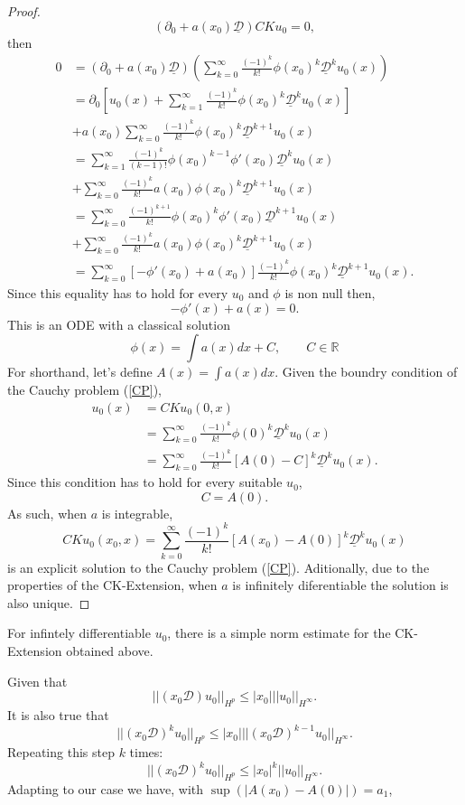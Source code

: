 \documentclass[12pt]{amsart}
\newcommand{\D}{\mathcal{D}}
\newcommand{\norm}[1]{|#1|}
\newcommand{\dnorm}[2]{||#1||_{#2}}
\theoremstyle{definition}
\begin{document}
\begin{proof}
\[
(\partial_0 + a(x_0)\underline{\D})CKu_0 =0,
\]
then
\begin{align*}
    0 
    &= (\partial_0 + a(x_0)\underline{\D})(\sum_{k = 0}^\infty \frac{(-1)^k}{k!}\phi(x_0)^k\underline{\D}^ku_0(x)) \\
    & = \partial_0[u_0(x) + \sum_{k = 1}^\infty \frac{(-1)^k}{k!}\phi(x_0)^k\underline{\D}^ku_0(x)]\\
    &+a(x_0)\sum_{k = 0}^\infty \frac{(-1)^k}{k!}\phi(x_0)^k\underline{\D}^{k+1}u_0(x) \\
    & = \sum_{k = 1}^\infty \frac{(-1)^k}{(k-1)!}\phi(x_0)^{k-1}\phi'(x_0)\underline{\D}^ku_0(x) \\
    &+\sum_{k = 0}^\infty \frac{(-1)^k}{k!}a(x_0)\phi(x_0)^k\underline{\D}^{k+1}u_0(x) \\
    &= \sum_{k = 0}^\infty \frac{(-1)^{k+1}}{k!}\phi(x_0)^k\phi'(x_0)\underline{\D}^{k+1}u_0(x) \\
    &+\sum_{k = 0}^\infty \frac{(-1)^k}{k!}a(x_0)\phi(x_0)^k\underline{\D}^{k+1}u_0(x) \\
    &= \sum_{k = 0}^\infty [-\phi'(x_0) + a(x_0)]\frac{(-1)^k}{k!}\phi(x_0)^k\underline{\D}^{k+1}u_0(x).
\end{align*}
Since this equality has to hold for every $u_0$ and $\phi$ is non null then,
\[  
-\phi'(x) + a(x) = 0. 
\]
This is an ODE with a classical solution
\[
\phi(x) = \int a(x) dx + C, \qquad C\in \mathbb{R}
\]
For shorthand, let's define $A(x) = \int a(x) dx$.
Given the boundry condition of the Cauchy problem (\ref{CP}),
\begin{align*}
    u_0(x) 
    &= CKu_0(0, x)\\
    &=\sum_{k = 0}^\infty \frac{(-1)^k}{k!}\phi(0)^k\underline{\D}^ku_0(x)\\
    &=\sum_{k = 0}^\infty \frac{(-1)^k}{k!}[A(0)-C]^k\underline{\D}^ku_0(x).
\end{align*}
Since this condition has to hold for every suitable $u_0$,
\[
C = A(0).
\]
As such, when $a$ is integrable,
\[
CKu_0(x_0, x) = \sum_{k = 0}^\infty \frac{(-1)^k}{k!}[A(x_0)-A(0)]^k\underline{\D}^ku_0(x)
\]
is an explicit solution to the Cauchy problem (\ref{CP}). Aditionally, due to the properties of the CK-Extension, when $a$ is infinitely diferentiable the solution is also unique. 
\end{proof}
For infintely differentiable $u_0$, there is a simple norm estimate for the CK-Extension obtained above.

Given that
\[
\dnorm{(x_0\D)u_0}{H^p} \leq \norm{x_0}\dnorm{u_0}{H^{\infty}}. 
\]
It is also true that
\[
\dnorm{(x_0\D)^ku_0}{H^p} \leq \norm{x_0}\dnorm{(x_0\D)^{k-1}u_0}{H^{\infty}}. 
\]
Repeating this step $k$ times:
\[
\dnorm{(x_0\D)^ku_0}{H^p} \leq \norm{x_0}^k\dnorm{u_0}{H^{\infty}}. 
\]
Adapting to our case we have, with $\sup (\norm{A(x_0)-A(0)}) = a_1$,
\end{document}
